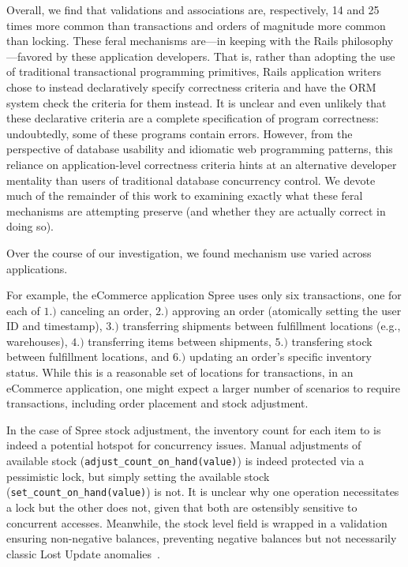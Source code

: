 Overall, we find that validations and associations are, respectively,
14 and 25 times more common than transactions and orders of magnitude
more common than locking. These feral mechanisms are---in keeping with
the Rails philosophy---favored by these application developers. That
is, rather than adopting the use of traditional transactional
programming primitives, Rails application writers chose to instead declaratively specify
correctness criteria and have the ORM system check the criteria for
them instead. It is unclear and even unlikely that these declarative
criteria are a complete specification of program correctness:
undoubtedly, some of these programs contain errors. However, from the
perspective of database usability and idiomatic web programming
patterns, this reliance on application-level correctness criteria
hints at an alternative developer mentality than users of traditional
database concurrency control.  We devote much of the remainder of this
work to examining exactly what these feral mechanisms are attempting
preserve (and whether they are actually correct in doing so).

 Over the course of our
investigation, we found mechanism use varied across applications.

For example, the eCommerce application Spree uses only six
transactions, one for each of $1.)$ canceling an order, $2.)$
approving an order (atomically setting the user ID and timestamp),
$3.)$ transferring shipments between fulfillment locations (e.g.,
warehouses), $4.)$ transferring items between shipments, $5.)$
transfering stock between fulfillment locations, and $6.)$ updating an
order's specific inventory status. While this is a reasonable set of
locations for transactions, in an eCommerce application, one might
expect a larger number of scenarios to require transactions, including
order placement and stock adjustment.

In the case of Spree stock adjustment, the inventory count for each
item to is indeed a potential hotspot for concurrency issues. Manual
adjustments of available stock
(\texttt{adjust\_count\_on\_hand(value)}) is indeed protected via a
pessimistic lock, but simply setting the available stock
(\texttt{set\_count\_on\_hand(value)}) is not. It is unclear why one
operation necessitates a lock but the other does not, given that both
are ostensibly sensitive to concurrent accesses. Meanwhile, the stock
level field is wrapped in a validation ensuring non-negative balances,
preventing negative balances but not necessarily classic Lost Update
anomalies~\cite{adya-isolation}.

